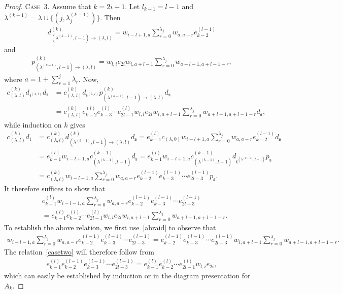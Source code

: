 \documentclass[11pt,a4paper,reqno,svgnames]{amsart}
\theoremstyle{plain}
\theoremstyle{definition}
\numberwithin{equation}{section}
\begin{document}
\begin{proof}
{\textsc{Case~3.}} Assume that $k=2i+1$. Let $l_{k-1}=l-1$ and $\lambda^{(k-1)}=\lambda \cup\lbrace(j,\lambda_j^{(k-1)})\rbrace$. Then
\begin{align*}
d_{(\lambda^{(k-1)},l-1)\to(\lambda,l)}^{(k)}= w_{i-l+1,a}\sum_{r=0}^{\lambda_j}w_{a,a-r}e_{k-2}^{(l-1)}
\end{align*}
and
\begin{align*} p_{(\lambda^{(k-1)},l-1)\to(\lambda,l)}^{(k)}= w_{l,i}e_{2i}w_{i,a+l-1}\sum_{r=0}^{\lambda_j} w_{a+l-1,a+l-1-r},
\end{align*} 
where $a=1+\sum_{r=1}^j\lambda_r$. Now,
\begin{align*}
c_{(\lambda,l)}^{(k)} d_{\mathfrak{t}^{(\lambda,l)}} d_\mathfrak{t}&= c_{(\lambda,l)}^{(k)} d_{\mathfrak{t}^{(\lambda,l)}}p_{(\lambda^{(k-1)},l-1) \to(\lambda,l)}^{(k)}d_\mathfrak{s}\\ &=c_{(\lambda,l)}^{(k)} e_{k-2}^{(l)}e_{k-3}^{(l)}\cdots e_{2l-1}^{(l)}w_{l,i}e_{2i}w_{i,a+l-1} \sum_{r=0}^{\lambda_j} w_{a+l-1,a+l-1-r}d_\mathfrak{s},
\end{align*}
while induction on $k$ gives
\begin{align*}
c_{(\lambda,l)}^{(k)}d_\mathfrak{t}&=c_{(\lambda,l)}^{(k)} d_{(\lambda^{(k-1)},l-1)\to(\lambda,l)}^{(k)} d_\mathfrak{s} =e_{k-1}^{(l)}c_{(\lambda,0)} w_{i-l+1,a}\sum_{r=0}^{\lambda_j}w_{a,a-r}e_{k-2}^{(l-1)}d_\mathfrak{s}\\
&=e_{k-1}^{(l)}w_{i-l+1,a}c_{(\lambda^{(k-1)},l-1)}^{(k-1)} d_\mathfrak{s} = e_{k-1}^{(l)}w_{i-l+1,a}c_{(\lambda^{(k-1)},l-1)}^{(k-1)} d_{\mathfrak{t}^{(\lambda^{(k-1)},l-1)}}p_\mathfrak{s}\\
&= c_{(\lambda,l)}^{(k)}w_{i-l+1,a}\sum_{r=0}^{\lambda_j}w_{a,a-r}e_{k-2}^{(l-1)} e_{k-3}^{(l-1)}\cdots e_{2l-3}^{(l-1)}   p_\mathfrak{s}. 
\end{align*}
It therefore suffices to show that
\begin{equation}\label{casetwo}
\begin{split}
&e_{k-1}^{(l)}w_{i-l-1,a}\sum_{r=0}^{\lambda_j} w_{a,a-r} e_{k-2}^{(l-1)}e_{k-3}^{(l-1)}\cdots e_{2l-3}^{(l-1)}\\&=  e_{k-1}^{(l)}e_{k-2}^{(l)}\cdots e_{2l-1}^{(l)} w_{l,i}e_{2i}w_{i,a+l-1}\sum_{r=0}^{\lambda_j} w_{a+l-1,a+l-1-r}.
\end{split}
\end{equation}
To establish the above relation, we first use~\eqref{abraid} to observe that 
\begin{align*}
w_{i-l-1,a}\sum_{r=0}^{\lambda_j} w_{a,a-r} e_{k-2}^{(l-1)}e_{k-3}^{(l-1)}\cdots e_{2l-3}^{(l-1)}= e_{k-2}^{(l-1)}e_{k-3}^{(l-1)}\cdots e_{2l-3}^{(l-1)} w_{i,a+l-1}\sum_{r=0}^{\lambda_j} w_{a+l-1,a+l-1-r}.
\end{align*}
The relation~\eqref{casetwo} will therefore follow from 
\begin{align*}
e_{k-1}^{(l)}e_{k-2}^{(l-1)}e_{k-3}^{(l-1)}\cdots e_{2l-3}^{(l-1)}= e_{k-1}^{(l)}e_{k-2}^{(l)}\cdots e_{2l-1}^{(l)}w_{l,i}e_{2i}, 
\end{align*}
which can easily be established by induction or in the diagram presentation for $A_k$. 


\end{proof}
\end{document}
